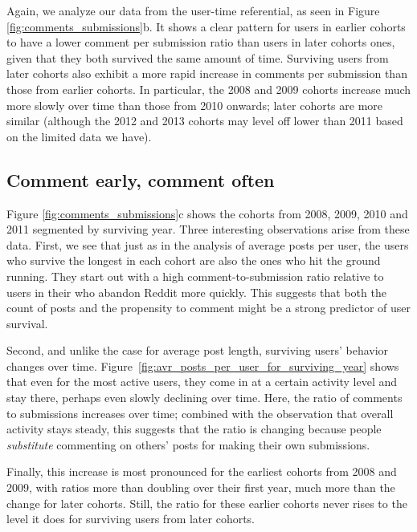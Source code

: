 Again, we analyze our data from the user-time referential, as seen in Figure \ref{fig:comments_submissions}b. It shows a clear pattern for users in earlier cohorts to have a lower comment per submission ratio than users in later cohorts ones, given that they both survived the same amount of time.  Surviving users from later cohorts also exhibit a more rapid increase in comments per submission than those from earlier cohorts.  In particular, the 2008 and 2009 cohorts increase much more slowly over time than those from 2010 onwards; later cohorts are more similar (although the 2012 and 2013 cohorts may level off lower than 2011 based on the limited data we have). 

\subsection{Comment early, comment often}

Figure \ref{fig:comments_submissions}c shows the cohorts from 2008, 2009, 2010 and 2011 segmented by surviving year.  Three interesting observations arise from these data.  First, we see that just as in the analysis of average posts per user, the users who survive the longest in each cohort are also the ones who hit the ground running.  They start out with a high comment-to-submission ratio relative to users in their who abandon Reddit more quickly.  This suggests that both the count of posts and the propensity to comment might be a strong predictor of user survival.

Second, and unlike the case for average post length, surviving users' behavior changes over time.  Figure~\ref{fig:avr_posts_per_user_for_surviving_year} shows that even for the most active users, they come in at a certain activity level and stay there, perhaps even slowly declining over time.  Here, the ratio of comments to submissions increases over time; combined with the observation that overall activity stays steady, this suggests that the ratio is changing because people \textit{substitute} commenting on others' posts for making their own submissions.

Finally, this increase is most pronounced for the earliest cohorts from 2008 and 2009, with ratios more than doubling over their first year, much more than the change for later cohorts.  Still, the ratio for these earlier cohorts never rises to the level it does for surviving users from later cohorts.  


